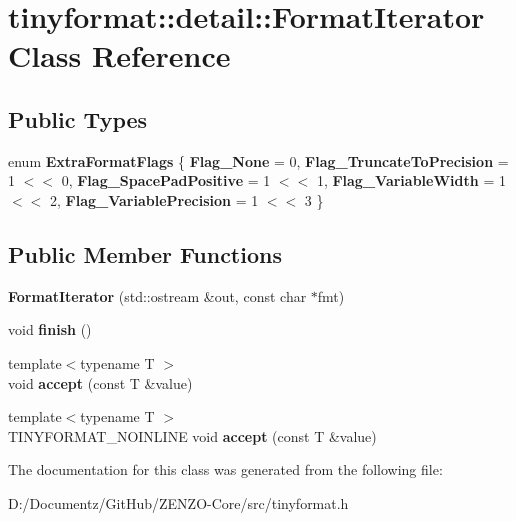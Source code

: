 \hypertarget{classtinyformat_1_1detail_1_1_format_iterator}{}\section{tinyformat\+::detail\+::Format\+Iterator Class Reference}
\label{classtinyformat_1_1detail_1_1_format_iterator}
\subsection*{Public Types}
\begin{DoxyCompactItemize}
\item 
\mbox{\label{classtinyformat_1_1detail_1_1_format_iterator_a219d15b3b08e2e2039043d2e992cc0b4}} 
enum {\bfseries Extra\+Format\+Flags} \{ \newline
{\bfseries Flag\+\_\+\+None} = 0, 
{\bfseries Flag\+\_\+\+Truncate\+To\+Precision} = 1 $<$$<$ 0, 
{\bfseries Flag\+\_\+\+Space\+Pad\+Positive} = 1 $<$$<$ 1, 
{\bfseries Flag\+\_\+\+Variable\+Width} = 1 $<$$<$ 2, 
\newline
{\bfseries Flag\+\_\+\+Variable\+Precision} = 1 $<$$<$ 3
 \}
\end{DoxyCompactItemize}
\subsection*{Public Member Functions}
\begin{DoxyCompactItemize}
\item 
\mbox{\label{classtinyformat_1_1detail_1_1_format_iterator_a798e0f475996df1b0a4f93540d96791b}} 
{\bfseries Format\+Iterator} (std\+::ostream \&out, const char $\ast$fmt)
\item 
\mbox{\label{classtinyformat_1_1detail_1_1_format_iterator_a46377a804f72dbad1e508d2fbaa18ce9}} 
void {\bfseries finish} ()
\item 
\mbox{\label{classtinyformat_1_1detail_1_1_format_iterator_a2a2b99ea3a371e1ff8d56d8c8b801bdb}} 
{\footnotesize template$<$typename T $>$ }\\void {\bfseries accept} (const T \&value)
\item 
\mbox{\label{classtinyformat_1_1detail_1_1_format_iterator_a914be2066071c01cac4c2ea867c9d89a}} 
{\footnotesize template$<$typename T $>$ }\\T\+I\+N\+Y\+F\+O\+R\+M\+A\+T\+\_\+\+N\+O\+I\+N\+L\+I\+NE void {\bfseries accept} (const T \&value)
\end{DoxyCompactItemize}


The documentation for this class was generated from the following file\+:\begin{DoxyCompactItemize}
\item 
D\+:/\+Documentz/\+Git\+Hub/\+Z\+E\+N\+Z\+O-\/\+Core/src/tinyformat.\+h\end{DoxyCompactItemize}
